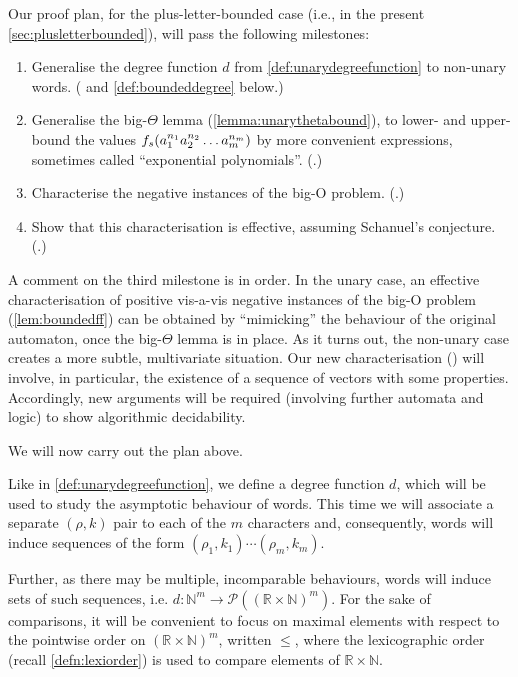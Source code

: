 \documentclass{lmcs}
\theoremstyle{plain}
\theoremstyle{definition}
\theoremstyle{remark}
\newcommand\dgf{d}
\renewcommand\nu{f}
\newcommand*{\br}{\nobreak\discretionary{}{\hbox{}}{}}
\begin{document}
Our proof plan, for the plus-letter-bounded case (i.e., in the present \cref{sec:plusletterbounded}), will pass the following milestones:
\begin{enumerate}[1.]
\item Generalise the degree function $\dgf$ from \cref{def:unarydegreefunction} to non-unary words.
      ( and \cref{def:boundeddegree} below.)
\item Generalise the big-$\Theta$ lemma (\cref{lemma:unarythetabound}), to lower- and upper-bound
      the values $\nu_s(a_1^{n_1}a_2^{n_2}\br\dots a_m^{n_m})$ by more convenient expressions,
      sometimes called ``exponential polynomials''.
      (.)
\item Characterise the negative instances of the big-O problem.
      (.)
\item Show that this characterisation is effective, assuming Schanuel's conjecture.
      (.)
\end{enumerate}
A comment on the third milestone is in order. In the unary case,
an effective characterisation of positive vis-a-vis negative instances of the big-O problem
(\cref{lem:boundedff}) can be obtained by ``mimicking'' the behaviour
of the original automaton, once the big-$\Theta$ lemma is in place.
As it turns out, the non-unary case
creates a more subtle, multivariate situation. Our new characterisation
() will involve, in particular, the existence
of a sequence of vectors with some properties. Accordingly, new arguments will be required
(involving further automata and logic) to show algorithmic decidability.

We will now carry out the plan above.

Like in \cref{def:unarydegreefunction}, we define a degree function $\dgf$, which will be used to study
the asymptotic behaviour of words. This time we will associate a separate $(\rho,k)$ pair to each of the $m$ characters and, consequently,
words will induce sequences of the form $(\rho_1,k_1)\cdots(\rho_m,k_m)$.

Further, as there may be multiple, incomparable behaviours, words will induce sets of such sequences, i.e. $\dgf\colon \mathbb{N}^m \to \mathcal{P}( (\mathbb{R}\times \mathbb{N})^m)$.
For the sake of comparisons, it will be convenient to focus on maximal elements with respect to the pointwise order on $ (\mathbb{R} \times \mathbb{N})^m$, written $\le$,
where the lexicographic order (recall \cref{defn:lexiorder}) is used to compare elements of $\mathbb{R} \times \mathbb{N}$.
\end{document}
